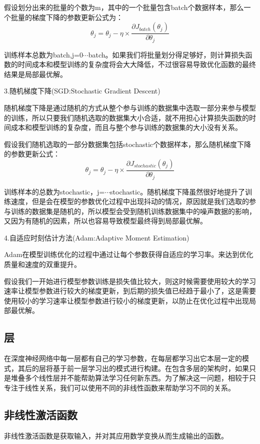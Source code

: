 \documentclass[openbib]{article}
\begin{document}
假设划分出来的批量的个数为m，其中的一个批量包含batch个数据样本，那么一个批量的梯度下降的参数更新公式为：
$$\theta_j=\theta_j-\eta\times\frac{\partial J_{batch}(\theta_j)}{\partial \theta_j}$$

训练样本总数为batch,j=0$\cdots$batch。如果我们将批量划分得足够好，则计算损失函数的时间成本和模型训练的复杂度将会大大降低，不过很容易导致优化函数的最终结果是局部最优解。

\begin{center}
	3.随机梯度下降(SGD:Stochastic Gradient Descent)
\end{center}

随机梯度下降是通过随机的方式从整个参与训练的数据集中选取一部分来参与模型的训练，所以只要我们随机选取的数据集大小合适，就不用担心计算损失函数的时间成本和模型训练的复杂度，而且与整个参与训练的数据集的大小没有关系。

假设我们随机选取的一部分数据集包括stochastic个数据样本，那么随机梯度下降的参数更新公式：
$$\theta_j=\theta_j-\eta\times\frac{\partial J_{stochastic}(\theta_j)}{\partial\theta_j}$$

训练样本的总数为stochastic，j=$\cdots$stochastic。随机梯度下降虽然很好地提升了训练速度，但是会在模型的参数优化过程中出现抖动的情况，原因就是我们选取的参与训练的数据集是随机的，所以模型会受到随机训练数据集中的噪声数据的影响，又因为有随机的因素，所以也容易导致模型最终得到局部最优解。

\begin{center}
	4.自适应时刻估计方法(Adam:Adaptive Moment Estimation)
\end{center}

Adam在模型训练优化的过程中通过让每个参数获得自适应的学习率。来达到优化质量和速度的双重提升。

假设我们一开始进行模型参数训练是损失值比较大，则这时候需要使用较大的学习速率让模型参数进行较大的梯度更新，到后期的损失值已经趋于最小了，这是需要使用较小的学习速率让模型参数进行较小的梯度更新，以防止在优化过程中出现局部最优解。
\subsection{层}
在深度神经网络中每一层都有自己的学习参数，在每层都学习出它本层一定的模式，其后的层将基于前一层学习出的模式进行构建。在包含多层的架构时，如果只是堆叠多个线性层并不能帮助算法学习任何新东西。为了解决这一问题，相较于只专注于线性关系，我们可以使用不同的非线性函数来帮助学习不同的关系。
\subsection{非线性激活函数}
非线性激活函数是获取输入，并对其应用数学变换从而生成输出的函数。
\end{document}
